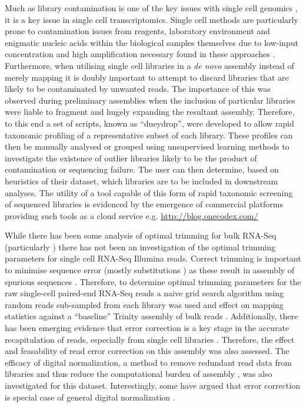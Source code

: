 Much as library contamination is one of the key issues with single cell genomics \citep{Blainey2013,Lusk2014}, it is a key
issue in single cell transcriptomics.  Single cell methods are particularly prone to contamination issues
from reagents, laboratory environment and enigmatic nucleic acids within the biological samples themselves due to 
low-input concentration and high amplification necessary found in these approaches \citep{Blainey2013}.
Furthermore, when utilising single cell libraries in a \textit{de novo} assembly instead of merely mapping
it is doubly important to attempt to discard libraries that are likely to be contaminated by unwanted
reads.  The importance of this was observed during preliminary assemblies when the inclusion of particular
libraries were liable to fragment and hugely expanding the resultant assembly.  
Therefore, to this end a set of scripts, known as ``dueydrop'', were developed to allow rapid taxonomic profiling of a
representative subset of each library.  These profiles can then be manually analysed or grouped using unsupervised learning methods 
to investigate the existence of outlier libraries likely to be the product of contamination or sequencing failure.
The user can then determine, based on heuristics of their dataset, which libraries are to be included in downstream analyses.
The utility of a tool capable of this form of rapid taxonomic screening of sequenced libraries is evidenced
by the emergence of commercial platforms providing such tools as a cloud service e.g. \url{http://blog.onecodex.com/}



While there has been some analysis of optimal trimming for bulk RNA-Seq (particularly \citep{MacManes2014})
there has not been an investigation of the optimal trimming parameters for single cell RNA-Seq Illumina reads.
Correct trimming is important to minimise sequence error (mostly substitutions \citep{Yang2013}) as these
result in assembly of spurious sequences \citep{Macmanes2013,MacManes2014}.  Therefore, to determine
optimal trimming parameters for the raw single-cell paired-end RNA-Seq reads 
a naive grid search algorithm using random reads sub-sampled from each library was used and effect on mapping
statistics against a ``baseline'' Trinity assembly of bulk reads \citep{Haas2013}.
Additionally, there has been emerging evidence that error correction is a key stage in the accurate
recapitulation of reads, especially from single cell libraries \citep{Medvedev2011}.  Therefore, the effect and feasability 
of read error correction on this assembly was also assessed.  
The efficacy of digital normalization, a method to remove redundant read data from libraries and thus
reduce the computational burden of assembly \citep{Brown2012}, was also investigated for this dataset.
Interestingly, some have argued that error correction is special case of general digital normalization
\citep{Krasileva2013}.


